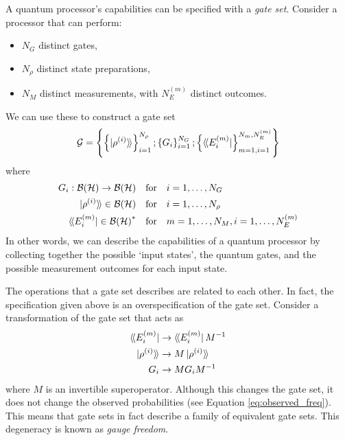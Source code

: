 A quantum processor's capabilities can be specified with a \textit{gate set}. Consider a processor
that can perform:
\begin{itemize}
    \item $N_G$ distinct gates,
    \item $N_{\rho}$ distinct state preparations,
    \item $N_M$ distinct measurements, with $N_E^{(m)}$ distinct outcomes.
\end{itemize}
We can use these to construct a gate set
\begin{equation}
    \mathcal{G} = 
    \left\{
        \left\{
            \ket{\rho^{(i)}}\!\rangle
        \right\}^{N_{\rho}}_{i=1} ;
        \left\{
            G_i
        \right\}^{N_G}_{i=1} ;
        \left\{
            \langle\!\bra{E_i^{(m)}}
        \right\}^{N_m, N_E^{(m)}}_{m=1, i=1}
    \right\}
\end{equation}
where
\begin{equation}
    \begin{aligned}
        G_i : \mathcal{B(H)} \to \mathcal{B(H)}  \quad &\text{for} \quad i = 1, \dots, N_G \\
        \ket{\rho^{(i)}}\!\rangle \in \mathcal{B(H)} \quad &\text{for} \quad i = 1, \dots, N_{\rho} \\
        \langle\!\bra{E_i^{(m)}} \in \mathcal{B(H)}^*  \quad &\text{for} \quad m = 1, \dots, N_M, i = 1, \dots, N_E^{(m)} \\
    \end{aligned}
\end{equation}
In other words, we can describe the capabilities of a quantum processor by collecting together the
possible `input states', the quantum gates, and the possible measurement outcomes for each input
state.

The operations that a gate set describes are related to each other. In fact, the specification given
above is an overspecification of the gate set. Consider a transformation of the gate set that acts
as
\begin{equation} \label{eq:gauge_freedom}
    \begin{aligned}
        \langle\!\bra{E_i^{(m)}}  &\to \langle\!\bra{E_i^{(m)}} M^{-1} \\
        \ket{\rho^{(i)}}\!\rangle &\to M \ket{\rho^{(i)}}\!\rangle \\
        G_i                   &\to M G_i M^{-1}
    \end{aligned}
\end{equation}
where $M$ is an invertible superoperator. Although this changes the gate set, it does not change the
observed probabilities (see Equation \ref{eq:observed_freq}). This means that gate sets in fact
describe a family of equivalent gate sets. This degeneracy is known as \textit{gauge freedom}.

